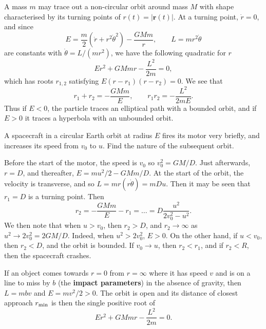 \documentclass[letter-paper]{tufte-book}
\newenvironment{example}[1][Example]{\begin{trivlist}
\item[\hskip \labelsep {\bfseries #1}]}{\end{trivlist}}
\newcommand{\rb}{\boldsymbol{r}}
\newcommand\Def[1]{\textbf{#1}}
\begin{document}
A mass $m$ may trace out a non-circular orbit around mass $M$ with shape
characterised by its turning points of $r(t) = |\rb(t)|$. At a turning point,
$\dot{r} = 0$, and since
\begin{equation*}
  E = \frac{m}{2}\left(\dot{r} + r^2 \dot{\theta}^2 \right) - \frac{GMm}{r},
  \qquad
  L = mr^2 \dot{\theta}
\end{equation*}
are constants with $\dot{\theta} = L / (mr^2)$, we have the following quadratic
for $r$
\begin{equation*}
  Er^2 + GMmr - \frac{L^2}{2m} = 0,
\end{equation*}
which has roots $r_{1,2}$ satisfying $E(r - r_1)(r - r_2) = 0$. We see that
\begin{equation*}
  r_1 + r_2 = -\frac{GMm}{E}, \qquad r_1 r_2 = -\frac{L^2}{2mE}.
\end{equation*}
Thus if $E < 0$, the particle traces an elliptical path with a bounded orbit,
and if $E > 0$ it traces a hyperbola with an unbounded orbit.
\begin{example}
  A spacecraft in a circular Earth orbit at radius $E$ fires its motor very
  briefly, and increases its speed from $v_0$ to $u$. Find the nature of the
  subsequent orbit.
  
  Before the start of the motor, the speed is $v_0$ so $v_0^2 = GM/D$. Just
  afterwards, $r = D$, and thereafter, $E = mu^2 / 2 - GMm / D$. At the start of
  the orbit, the velocity is transverse, and so $L = mr(r\dot{\theta}) = mD u$.
  Then it may be seen that $r_1 = D$ is a turning point. Then
  \begin{equation*}
    r_2 = -\frac{GMm}{E} - r_1 = \ldots = D\frac{u^2}{2v_0^2 - u^2}.
  \end{equation*}
  We then note that when $u > v_0$, then $r_2 > D$, and $r_2 \to \infty$
  as $u^2 \to 2v_0^2 = 2GM/D$. Indeed, when $u^2 > 2v_0^2$, $E > 0$. On the
  other hand, if $u < v_0$, then $r_2 < D$, and the orbit is bounded. If $v_0
  \to u$, then $r_2 < r_1$, and if $r_2 < R$, then the spacecraft crashes.
\end{example}

If an object comes towards $r = 0$ from $r = \infty$ where it has speed $v$ and
is on a line to miss by $b$ (the \Def{impact parameters}) in the absence
of gravity, then $L = mbv$ and $E = mv^2 / 2 > 0$. The orbit is open and its
distance of closest approach $r_{\rm min}$ is then the single positive root of
\begin{equation*}
  Er^2 + GMmr - \frac{L^2}{2m} = 0.
\end{equation*}
\end{document}
